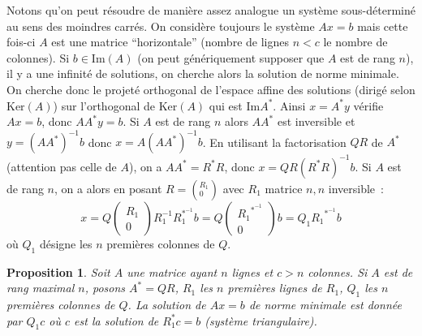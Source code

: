 \documentclass[a4paper,11pt]{book}
\newtheorem{prop}[thm]{Proposition}
\begin{document}
\begin{giacjshere}
Notons qu'on peut r\'esoudre de mani\`ere assez analogue
un syst\`eme sous-d\'etermin\'e au sens des moindres carr\'es.
On consid\`ere toujours le syst\`eme $Ax=b$ mais cette fois-ci
$A$ est une matrice ``horizontale'' (nombre de lignes $n<c$ le nombre
de colonnes). Si $b \in $Im$(A)$ (on peut g\'en\'eriquement supposer
que $A$ est de rang $n$), 
il y a une infinit\'e de solutions, on
cherche alors la solution de norme minimale. On cherche donc le
projet\'e orthogonal de l'espace affine des solutions (dirig\'e selon Ker$(A)$)
sur l'orthogonal de Ker$(A)$ qui est Im$A^*$. Ainsi $x=A^*y$
v\'erifie $Ax=b$, donc $AA^*y=b$. Si $A$ est de rang $n$ alors
$AA^* $ est inversible et $y=(AA^*)^{-1}b$ donc $x=A (AA^*)^{-1}b$.
En utilisant la factorisation $QR$ de $A^*$ (attention pas celle de
$A$), on a $AA^*=R^*R$, donc $x=QR(R^*R)^{-1}b$. Si $A$ est de rang $n$,
on a alors en posant $R=(^{R_1}_{0})$ avec $R_1$ matrice $n,n$ inversible~:
$$x=Q\left(\begin{array}{c}R_1\\0\end{array}\right)R_1^{-1} R_1^{*^{-1}}b=Q\left(\begin{array}{c}
{R_1}^{*^{-1}} \\ 0\end{array}\right)b=Q_1 {R_1}^{*^{-1}} b$$
o\`u $Q_1$ d\'esigne les $n$ premi\`eres colonnes de $Q$.
\begin{prop}
Soit $A$ une matrice ayant $n$ lignes et $c>n$ colonnes.
Si $A$ est de rang maximal $n$, posons $A^*=QR$, $R_1$ les $n$
premi\`eres lignes de $R_1$, $Q_1$ les $n$ premi\`eres colonnes
de $Q$. La solution de $Ax=b$ de norme
minimale est donn\'ee par $Q_1c$ o\`u $c$ est la solution de $R_1^*c=b$
(syst\`eme triangulaire).
\end{prop}


\end{giacjshere}
\end{document}
